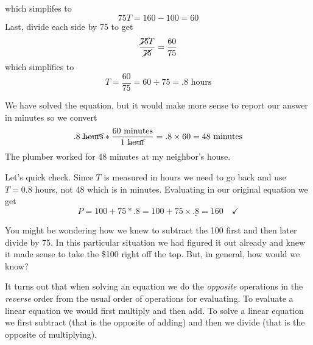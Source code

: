 \noindent which simplifes to $$75T=160-100=60$$  
Last, divide each side by 75 to get $$\frac{\cancel{75}T}{\cancel{75}}=\frac{60}{75}$$ which simplifies to $$T = \frac{60}{75} = 60\div75=.8 \text{ hours}$$  

We have solved the equation, but it would make more sense to report our answer in minutes so we convert $$.8 \text{ \cancel{hours}} \ast \frac{60 \text{ minutes}}{1 \text{ \cancel{hour}}} = .8 \times 60 = 48 \text{ minutes}$$  The plumber worked for 48 minutes at my neighbor's house.

Let's quick check.  Since $T$ is measured in hours we need to go back and use $T= 0.8$ hours, not 48 which is in minutes.  Evaluating in our original equation we get $$P=100 + 75 \ast .8 = 100+75\times\underline{.8}= 160 \quad \checkmark$$  

You might be wondering how we knew to subtract the 100 first and then later divide by 75.  In this particular situation we had figured it out already and knew it made sense to take the \$100 right off the top.  But, in general, how would we know?  

It turns out that when solving an equation we do the \emph{opposite} operations in the \emph{reverse} order from the usual order of operations for evaluating.  To evaluate a linear equation we would first multiply and then add.  To solve a linear equation we first subtract (that is the opposite of adding) and then we divide (that is the opposite of multiplying).  %


%